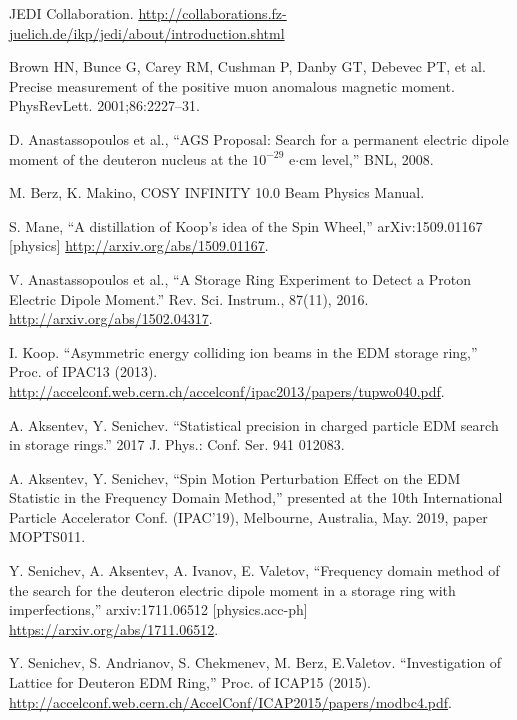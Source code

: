 \documentclass[]{elsarticle}
\begin{document}
\begin{thebibliography}{9}

  JEDI Collaboration. \url{http://collaborations.fz-juelich.de/ikp/jedi/about/introduction.shtml}

  Brown HN, Bunce G, Carey RM, Cushman P, Danby GT, Debevec PT, et al.
  Precise measurement of the positive muon anomalous magnetic moment. PhysRevLett. 2001;86:2227–31. 

  
  D. Anastassopoulos et al., ``AGS Proposal: Search for a permanent electric dipole moment of
  the deuteron nucleus at the $10^{-29}$ e$\cdot$cm level,'' BNL, 2008.

  M. Berz, K. Makino, COSY INFINITY 10.0 Beam Physics Manual.

  S. Mane, ``A distillation of Koop's idea of the Spin Wheel,'' arXiv:1509.01167 [physics]
  \url{http://arxiv.org/abs/1509.01167}.

  V. Anastassopoulos et al., ``A Storage Ring Experiment to Detect a Proton Electric Dipole Moment.''
  Rev. Sci. Instrum., 87(11), 2016.
  \url{http://arxiv.org/abs/1502.04317}.

  I. Koop. ``Asymmetric energy colliding ion beams in the EDM storage ring,'' Proc. of IPAC13 (2013).
  \url{http://accelconf.web.cern.ch/accelconf/ipac2013/papers/tupwo040.pdf}.

  A. Aksentev, Y. Senichev. ``Statistical precision in charged particle EDM search in storage rings.''
  2017 J. Phys.: Conf. Ser. 941 012083.

  A. Aksentev, Y. Senichev, ``Spin Motion Perturbation Effect on the EDM Statistic
  in the Frequency Domain Method,'' presented at the 10th International Particle Accelerator Conf. (IPAC'19),
  Melbourne, Australia, May. 2019, paper MOPTS011.

  Y. Senichev, A. Aksentev, A. Ivanov, E. Valetov, ``Frequency domain method of the search for
  the deuteron electric dipole moment in a storage ring with imperfections,'' arxiv:1711.06512 [physics.acc-ph]
  \url{https://arxiv.org/abs/1711.06512}.

  Y. Senichev, S. Andrianov, S. Chekmenev, M. Berz, E.Valetov. ``Investigation of Lattice for Deuteron EDM Ring,''
  Proc. of ICAP15 (2015). \url{http://accelconf.web.cern.ch/AccelConf/ICAP2015/papers/modbc4.pdf}.


\end{thebibliography}
\end{document}
